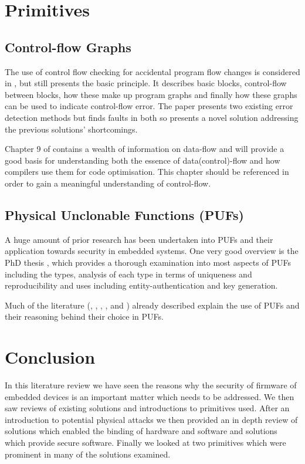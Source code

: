 \section{Primitives}

\subsection{Control-flow Graphs}

The use of control flow checking for accidental program flow changes is considered in \cite{Goloubeva2003}, but still presents the basic principle. It describes basic blocks, control-flow between blocks, how these make up program graphs and finally how these graphs can be used to indicate control-flow error. The paper presents two existing error detection methods but finds faults in both so presents a novel solution addressing the previous solutions' shortcomings.

Chapter 9 of \cite{AhoAlfredV.2014C:pt} contains a wealth of information on data-flow and will provide a good basis for understanding both the essence of data(control)-flow and how compilers use them for code optimisation. This chapter should be referenced in order to gain a meaningful understanding of control-flow.


\subsection{Physical Unclonable Functions (PUFs)}

A huge amount of prior research has been undertaken into PUFs and their application towards security in embedded systems. One very good overview is the PhD thesis \cite{Maes2012}, which provides a thorough examination into most aspects of PUFs including the types, analysis of each type in terms of uniqueness and reproducibility and uses including entity-authentication and key generation.

Much of the literature (\cite{Lee2016}, \cite{Schaller2014}, \cite{Kleber2015}, \cite{Kohnhauser2015}, \cite{Gora2010} and \cite{Simpson2006}) already described explain the use of PUFs and their reasoning behind their choice in PUFs.

\section{Conclusion}

In this literature review we have seen the reasons why the security of firmware of embedded devices is an important matter which needs to be addressed. We then saw reviews of existing solutions and introductions to primitives used. After an introduction to potential physical attacks we then provided an in depth review of solutions which enabled the binding of hardware and software and solutions which provide secure software. Finally we looked at two primitives which were prominent in many of the solutions examined.
